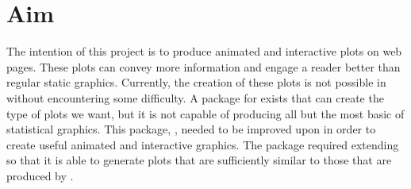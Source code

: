 \chapter{Aim}

The intention of this project is to produce animated and interactive plots on web pages.
These plots can convey more information and engage a reader better than regular static graphics.
Currently, the creation of these plots is not possible in \R{} without encountering some difficulty.
A package for \R{} exists that can create the type of plots we want, but it is not capable of producing all but the most basic of statistical graphics.
This package, \gridSVG{}, needed to be improved upon in order to create useful animated and interactive graphics.
The \gridSVG{} package required extending so that it is able to generate plots that are sufficiently similar to those that are produced by \R{}.
